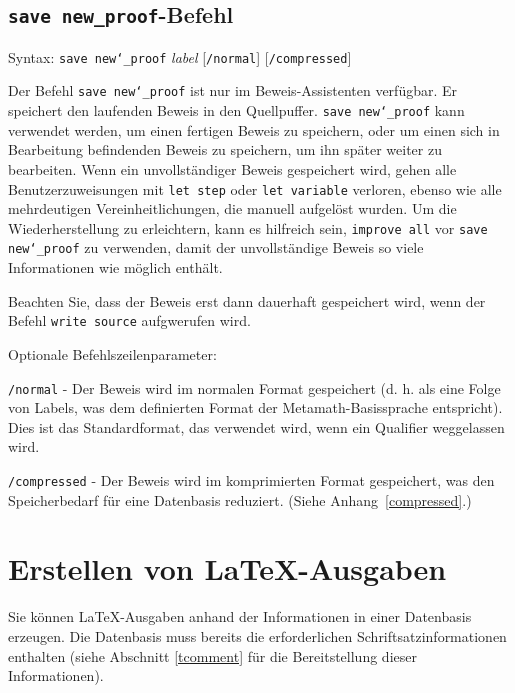\subsection{\texttt{save new\_proof}-Befehl}

Syntax:  \texttt{save new{\char`\_}proof} {\em label} [\texttt{/normal}]
   [\texttt{/compressed}]

Der Befehl \texttt{save new{\char`\_}proof} ist nur im Beweis-Assistenten verfügbar.  Er speichert den laufenden Beweis in den Quellpuffer.  \texttt{save new{\char`\_}proof} kann verwendet werden, um einen fertigen Beweis zu speichern, oder um einen sich in Bearbeitung befindenden Beweis zu speichern, um ihn später weiter zu bearbeiten.  Wenn ein unvollständiger Beweis gespeichert wird, gehen alle Benutzerzuweisungen mit \texttt{let step} oder \texttt{let variable} verloren, ebenso wie alle mehrdeutigen Vereinheitlichungen, die manuell aufgelöst wurden. Um die Wiederherstellung zu erleichtern, kann es hilfreich sein, \texttt{improve all} vor \texttt{save new{\char`\_}proof} zu verwenden, damit der unvollständige Beweis so viele Informationen wie möglich enthält. 

Beachten Sie, dass der Beweis erst dann dauerhaft gespeichert wird, wenn der Befehl \texttt{write source} aufgwerufen wird. 

Optionale Befehlszeilenparameter:

    \texttt{/normal} - Der Beweis wird im normalen Format gespeichert (d. h. als eine Folge von Labels, was dem definierten Format der Metamath-Basissprache entspricht).  Dies ist das Standardformat, das verwendet wird, wenn ein Qualifier weggelassen wird.

    \texttt{/compressed} - Der Beweis wird im komprimierten Format gespeichert, was den Speicherbedarf für eine Datenbasis reduziert. (Siehe Anhang~\ref{compressed}.)


\section{Erstellen von \LaTeX-Ausgaben}\label{texout}

Sie können \LaTeX-Ausgaben anhand der Informationen in einer Datenbasis erzeugen. Die Datenbasis muss bereits die erforderlichen Schriftsatzinformationen enthalten (siehe Abschnitt \ref{tcomment} für die Bereitstellung dieser Informationen). 

